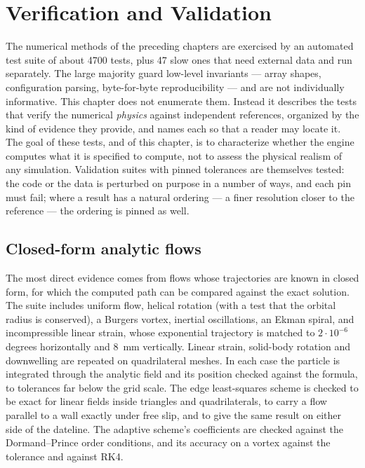 \chapter{Verification and Validation}\label{ch:validation}

The numerical methods of the preceding chapters are exercised by an automated test suite of about
\num{4700} tests, plus \num{47} slow ones that need external data and run separately. The large majority guard low-level invariants --- array shapes, configuration parsing,
byte-for-byte reproducibility --- and are not individually informative. This chapter does not enumerate
them. Instead it describes the tests that verify the numerical \emph{physics} against independent
references, organized by the kind of evidence they provide, and names each so that a reader may locate it.
The goal of these tests, and of this chapter, is to characterize whether the engine computes what it is
specified to compute, not to assess the physical realism of any simulation. Validation suites with pinned
tolerances are themselves tested: the code or the data is perturbed on purpose in a number of ways, and each
pin must fail; where a result has a natural ordering --- a finer resolution closer to the reference --- the
ordering is pinned as well.


\section{Closed-form analytic flows}\label{sec:val-analytic}

The most direct evidence comes from flows whose trajectories are known in closed form, for which the
computed path can be compared against the exact solution. The suite includes uniform flow, helical rotation
(with a test that the orbital radius is conserved), a Burgers vortex, inertial oscillations, an Ekman spiral,
and incompressible linear strain, whose exponential trajectory is matched to $2\cdot10^{-6}$ degrees
horizontally and \SI{8}{mm} vertically. Linear strain, solid-body rotation and downwelling are repeated on
quadrilateral meshes. In each case
the particle is integrated through the analytic field and its position checked against the formula, to
tolerances far below the grid scale. The edge least-squares scheme is checked to be exact for linear fields
inside triangles and quadrilaterals, to carry a flow parallel to a wall exactly under free slip, and to give
the same result on either side of the dateline. The adaptive scheme's coefficients are checked against the
Dormand--Prince order conditions, and its accuracy on a vortex against the tolerance and against RK4.

